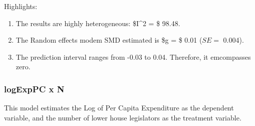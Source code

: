 \documentclass[
]{article}
\newenvironment{Shaded}{\begin{snugshade}}{\end{snugshade}}
\newcommand{\CommentTok}[1]{\textcolor[rgb]{0.56,0.35,0.01}{\textit{#1}}}
\newcommand{\DataTypeTok}[1]{\textcolor[rgb]{0.13,0.29,0.53}{#1}}
\newcommand{\KeywordTok}[1]{\textcolor[rgb]{0.13,0.29,0.53}{\textbf{#1}}}
\newcommand{\NormalTok}[1]{#1}
\newcommand{\OperatorTok}[1]{\textcolor[rgb]{0.81,0.36,0.00}{\textbf{#1}}}
\newcommand{\OtherTok}[1]{\textcolor[rgb]{0.56,0.35,0.01}{#1}}
\newcommand{\StringTok}[1]{\textcolor[rgb]{0.31,0.60,0.02}{#1}}
\providecommand{\tightlist}{%
  \setlength{\itemsep}{0pt}\setlength{\parskip}{0pt}}
\begin{document}
Highlights:

\begin{enumerate}
\def\labelenumi{\arabic{enumi}.}
\tightlist
\item
  The results are highly heterogeneous: \$I\^{}2 = \$ 98.48.
\item
  The Random effects modem SMD estimated is \$g = \$ 0.01 (\(SE =\)
  0.004).
\item
  The prediction interval ranges from -0.03 to 0.04. Therefore, it
  emcompasses zero.
\end{enumerate}

\newpage

\hypertarget{logexppc-x-n-1}{%
\subsubsection{logExpPC x N}\label{logexppc-x-n-1}}

This model estimates the Log of Per Capita Expenditure as the dependent
variable, and the number of lower house legislators as the treatment
variable.

\begin{Shaded}
\end{Shaded}
\end{document}
